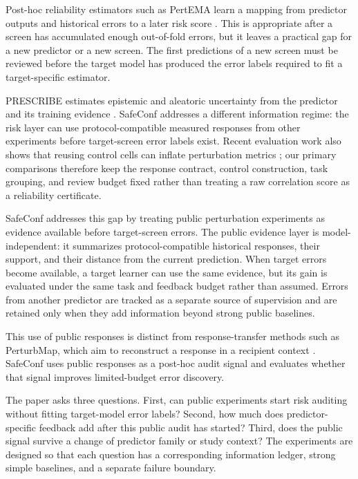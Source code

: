 \documentclass[journal]{IEEEtran}
\begin{document}
Post-hoc reliability estimators such as PertEMA learn a mapping from predictor outputs and historical errors to a later risk score \cite{officialbishal2025pertema}. This is appropriate after a screen has accumulated enough out-of-fold errors, but it leaves a practical gap for a new predictor or a new screen. The first predictions of a new screen must be reviewed before the target model has produced the error labels required to fit a target-specific estimator.

PRESCRIBE estimates epistemic and aleatoric uncertainty from the predictor and its training evidence \cite{cheng2025prescribe}. SafeConf addresses a different information regime: the risk layer can use protocol-compatible measured responses from other experiments before target-screen error labels exist. Recent evaluation work also shows that reusing control cells can inflate perturbation metrics \cite{nicol2026spurious}; our primary comparisons therefore keep the response contract, control construction, task grouping, and review budget fixed rather than treating a raw correlation score as a reliability certificate.

SafeConf addresses this gap by treating public perturbation experiments as evidence available before target-screen errors. The public evidence layer is model-independent: it summarizes protocol-compatible historical responses, their support, and their distance from the current prediction. When target errors become available, a target learner can use the same evidence, but its gain is evaluated under the same task and feedback budget rather than assumed. Errors from another predictor are tracked as a separate source of supervision and are retained only when they add information beyond strong public baselines.

This use of public responses is distinct from response-transfer methods such as PerturbMap, which aim to reconstruct a response in a recipient context \cite{cui2026perturbmap}. SafeConf uses public responses as a post-hoc audit signal and evaluates whether that signal improves limited-budget error discovery.

The paper asks three questions. First, can public experiments start risk auditing without fitting target-model error labels? Second, how much does predictor-specific feedback add after this public audit has started? Third, does the public signal survive a change of predictor family or study context? The experiments are designed so that each question has a corresponding information ledger, strong simple baselines, and a separate failure boundary.
\end{document}
